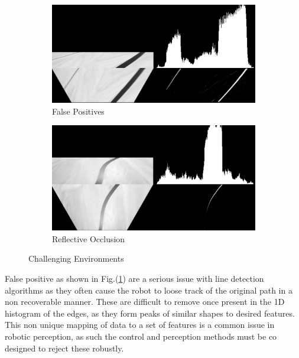         \begin{figure}[H]
            \centering
            \begin{subfigure}[b]{0.45\textwidth}
                \includegraphics[width=\textwidth]{visionpipeline/vizFalsePos.png}
                \caption{False Positives}
                \label{fig:FalsePositives}
            \end{subfigure}
            \hfill
            \begin{subfigure}[b]{0.45\textwidth}
                \includegraphics[width=\textwidth]{visionpipeline/vizLightOclusion.png}
                \caption{Reflective Occlusion}
                \label{fig:ReflectOcclusion}
            \end{subfigure}
            \caption{Challenging Environments}
            \label{fig:ChallengingEnvironments}
        \end{figure}

        False positive as shown in Fig.(\ref{fig:FalsePositives}) are a serious issue with line detection algorithms as 
        they often cause the robot to loose track of the original path in a non recoverable manner.
        These are difficult to remove once present in the 1D histogram of the edges, as they form peaks of similar shapes to desired features. 
        This non unique mapping of data to a set of features is a common issue in robotic perception, as such the control and perception methods 
        must be co designed to reject these robustly.
        
